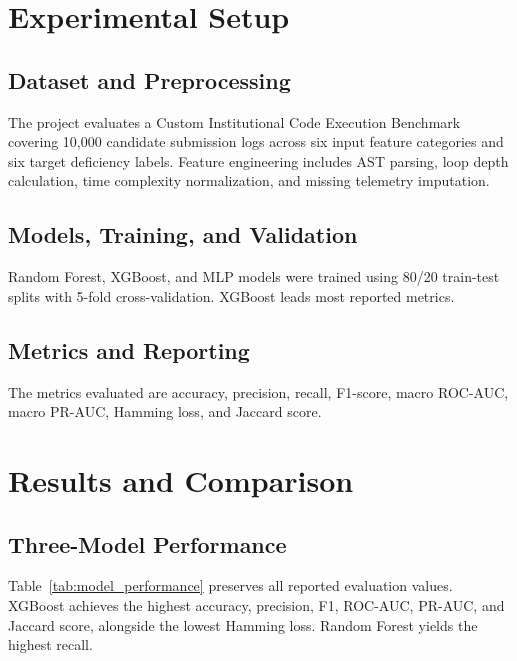 \documentclass[conference]{IEEEtran}
\begin{document}
\section{Experimental Setup}

\subsection{Dataset and Preprocessing}
The project evaluates a Custom Institutional Code Execution Benchmark covering 10,000 candidate submission logs across six input feature categories and six target deficiency labels. Feature engineering includes AST parsing, loop depth calculation, time complexity normalization, and missing telemetry imputation.

\subsection{Models, Training, and Validation}
Random Forest, XGBoost, and MLP models were trained using 80/20 train-test splits with 5-fold cross-validation. XGBoost leads most reported metrics.

\subsection{Metrics and Reporting}
The metrics evaluated are accuracy, precision, recall, F1-score, macro ROC-AUC, macro PR-AUC, Hamming loss, and Jaccard score.

\section{Results and Comparison}
\label{sec:results}

\subsection{Three-Model Performance}
Table~\ref{tab:model_performance} preserves all reported evaluation values. XGBoost achieves the highest accuracy, precision, F1, ROC-AUC, PR-AUC, and Jaccard score, alongside the lowest Hamming loss. Random Forest yields the highest recall.
\end{document}
